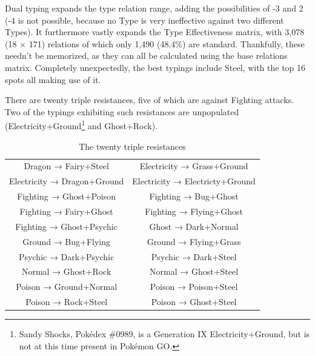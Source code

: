 Dual typing expands the type relation range, adding the possibilities
 of -3 and 2 (-4 is not possible, because no Type is very ineffective against
 two different Types).
It furthermore vastly expands the Type Effectiveness matrix,
 with 3,078 (18 × 171) relations of which only 1,490 (48.4\%) are standard.
Thankfully, these needn't be memorized, as they can all be calculated
 using the base relations matrix.
Completely unexpectedly, the best typings include Steel, with the top 16
 spots all making use of it.



There are twenty triple resistances, five of which are against Fighting attacks.
Two of the typings exhibiting such resistances are unpopulated
  (Electricity+Ground\footnote{Sandy Shocks, Pokédex \#0989, is a Generation IX
  Electricity+Ground, but is not at this time present in Pokémon GO.} and Ghost+Rock).
\begin{table}[h]
  \begin{center}
    \begin{tabular}{cc}
Dragon → Fairy+Steel & Electricity → Grass+Ground \\
Electricity → Dragon+Ground & Electricity → Electricty+Ground \\
Fighting → Ghost+Poison & Fighting → Bug+Ghost \\
Fighting → Fairy+Ghost & Fighting → Flying+Ghost \\
Fighting → Ghost+Psychic & Ghost → Dark+Normal \\
Ground → Bug+Flying & Ground → Flying+Grass \\
Psychic → Dark+Psychic & Psychic → Dark+Steel \\
Normal → Ghost+Rock & Normal → Ghost+Steel \\
Poison → Ground+Normal & Poison → Poison+Steel \\
Poison → Rock+Steel & Poison → Ghost+Steel \\
    \end{tabular}
    \caption{The twenty triple resistances}
  \end{center}
\end{table}

